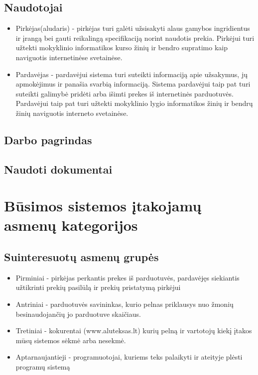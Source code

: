 \documentclass[oneside]{VUMIFPSkursinis}
\begin{document}
	\subsection{Naudotojai}
		\begin{itemize}
			\item{Pirkėjas(aludaris) - pirkėjas turi galėti užsisakyti alaus gamybos ingridientus ir įrangą bei gauti reikalingą specifikaciją norint naudotis prekia.
				Pirkėjui turi užtekti mokyklinio informatikos kurso žinių ir bendro supratimo kaip naviguotis internetinėse svetainėse.}
			\item{Pardavėjas - pardavėjui sistema turi suteikti informaciją apie užsakymus, jų apmokėjimus ir panašia svarbią informaciją.
				Sistema pardavėjui taip pat turi suteikti galimybė pridėti arba išimti prekes iš internetinės parduotuvės.
				Pardavėjui taip pat turi užtekti mokyklinio lygio informatikos žinių ir bendrų žinių naviguotis interneto svetainėse.}
		\end{itemize}
	\subsection{Darbo pagrindas}
	\subsection{Naudoti dokumentai}

\section{Būsimos sistemos įtakojamų asmenų kategorijos}
	\subsection{Suinteresuotų asmenų grupės}
		\begin{itemize}
			\item{Pirminiai - pirkėjas perkantis prekes iš parduotuvės, pardavėjęs siekiantis užtikrinti prekių pasilūlą ir prekių pristatymą pirkėjui}
			\item{Antriniai - parduotuvės savininkas, kurio pelnas priklausys nuo žmonių besinaudojančių jo parduotuve skaičiaus.}
			\item{Tretiniai - kokurentai (www.aluteksas.lt) kurių pelną ir vartotojų kiekį įtakos mūsų sistemos sėkmė arba nesekmė. }
			\item{Aptarnaujantieji - programuotojai, kuriems teks palaikyti ir ateityje plėsti programų sistemą}
		\end{itemize}
\end{document}
